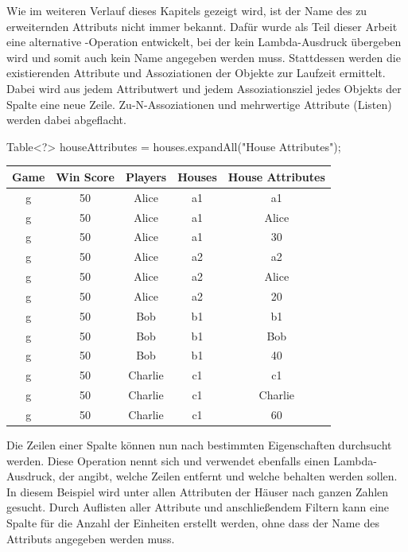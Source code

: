 Wie im weiteren Verlauf dieses Kapitels gezeigt wird, ist der Name des zu erweiternden Attributs nicht immer bekannt.
Dafür wurde als Teil dieser Arbeit eine alternative -Operation entwickelt, bei der kein Lambda-Ausdruck übergeben wird und somit auch kein Name angegeben werden muss.
Stattdessen werden die existierenden Attribute und Assoziationen der Objekte zur Laufzeit ermittelt.
Dabei wird aus jedem Attributwert und jedem Assoziationsziel jedes Objekts der Spalte  eine neue Zeile.
Zu-N-Assoziationen und mehrwertige Attribute (Listen) werden dabei abgeflacht.

\begin{jcodeblock}
    Table<?> houseAttributes = houses.expandAll("House Attributes");
\end{jcodeblock}

\begin{tabular}{|c|c|c|c|c|}
    \hline
    \textbf{Game} & \textbf{Win Score} & \textbf{Players} & \textbf{Houses} & \textbf{House Attributes} \\
    \hline
    g & 50 & Alice   & a1 & a1      \\
    g & 50 & Alice   & a1 & Alice   \\
    g & 50 & Alice   & a1 & 30      \\
    g & 50 & Alice   & a2 & a2      \\
    g & 50 & Alice   & a2 & Alice   \\
    g & 50 & Alice   & a2 & 20      \\
    g & 50 & Bob     & b1 & b1      \\
    g & 50 & Bob     & b1 & Bob     \\
    g & 50 & Bob     & b1 & 40      \\
    g & 50 & Charlie & c1 & c1      \\
    g & 50 & Charlie & c1 & Charlie \\
    g & 50 & Charlie & c1 & 60      \\
    \hline
\end{tabular}

Die Zeilen einer Spalte können nun nach bestimmten Eigenschaften durchsucht werden.
Diese Operation nennt sich  und verwendet ebenfalls einen Lambda-Ausdruck, der angibt, welche Zeilen entfernt und welche behalten werden sollen.
In diesem Beispiel wird unter allen Attributen der Häuser nach ganzen Zahlen gesucht.
Durch Auflisten aller Attribute und anschließendem Filtern kann eine Spalte für die Anzahl der Einheiten erstellt werden, ohne dass der Name des Attributs angegeben werden muss.

